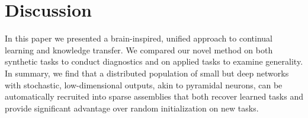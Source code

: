 \documentclass[11pt]{article}
\begin{document}


\section{Discussion}\label{sec:discussion}
In this paper we presented a brain-inspired, unified approach to continual learning and knowledge transfer. We compared our novel method on both synthetic tasks to conduct diagnostics and on applied tasks to examine generality. In summary, we find that a distributed population of small but deep networks with stochastic, low-dimensional outputs, akin to pyramidal neurons, can be automatically recruited into sparse assemblies that both recover learned tasks and provide significant advantage over random initialization on new tasks.
\end{document}
